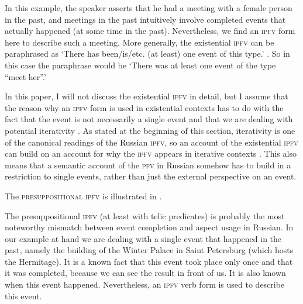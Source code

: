 \documentclass[output=paper]{langscibook}
\begin{document}
\label{gehr:ex:existential} \z 

\noindent In this example, the speaker asserts that he had a meeting with a female person in the past, and meetings in the past intuitively involve completed events that actually happened (at some time in the past). Nevertheless, we find an \textsc{ipfv} form here to describe such a meeting. More generally, the existential \textsc{ipfv} can be paraphrased as `There has been/is/etc. (at least) one event of this type.' \citep[following the idea that existential \textsc{ipfv}s involve event types or kinds; see][]{mehlig01, mehlig13, gehrkemueller}. So in this case the paraphrase would be `There was at least one event of the type ``meet her''.' 

In this paper, I will not discuss the existential \textsc{ipfv} in detail, but I assume that the reason why an \textsc{ipfv} form is used in existential contexts has to do with the fact that the event is not necessarily a single event and that we are dealing with potential iterativity \citep[labeled \textit{kratnost'} `(lit.) multiple-ness' in][]{paduceva96}. As stated at the beginning of this section, iterativity is one of the canonical readings of the Russian \textsc{ipfv}, so an account of the existential \textsc{ipfv} can build on an account for why the \textsc{ipfv} appears in iterative contexts \citep[e.g. in terms of unbounded event plurality, as in][]{ferreira05, altshuler14}. This also means that a semantic account of the \textsc{pfv} in Russian somehow has to build in a restriction to single events, rather than just the external perspective on an event.   

The \textsc{presuppositional ipfv} is illustrated in  \citep[from][]{glovinskaja82}.

\label{gehr:ex:presuppositional}
\z 

\noindent The presuppositional \textsc{ipfv} (at least with telic predicates) is probably the most noteworthy mismatch between event completion and aspect usage in Russian. In our example at hand we are dealing with a single event that happened in the past, namely the building of the Winter Palace in Saint Petersburg (which hosts the Hermitage). It is a known fact that this event took place only once and that it was completed, because we can see the result in front of us. It is also known when this event happened. Nevertheless, an \textsc{ipfv} verb form is used to describe this event. 
\end{document}
